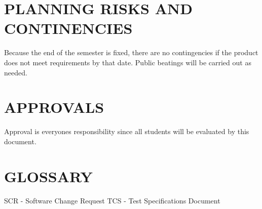 \documentclass[report]{article}
\begin{document}
\section[PLANNING RISKS AND CONTINGENCIES]{PLANNING RISKS AND CONTINENCIES}
Because the end of the semester is fixed, there are no contingencies if the product does not meet requirements by that date. Public beatings will be carried out as needed.

\section[APPROVALS]{APPROVALS}
Approval is everyones responsibility since all students will be evaluated by this document.

\section[GLOSSARY]{GLOSSARY}
SCR - Software Change Request
TCS - Test Specifications Document
\end{document}
